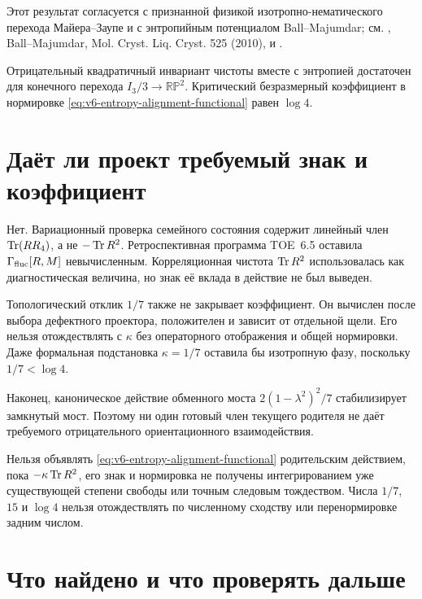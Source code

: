 Этот результат согласуется с признанной физикой изотропно-нематического
перехода Майера--Заупе и с энтропийным потенциалом Ball--Majumdar; см.
, Ball--Majumdar, Mol. Cryst. Liq. Cryst. 525
(2010), и .

\begin{proposition}
Отрицательный квадратичный инвариант чистоты вместе с энтропией достаточен
для конечного перехода $I_3/3\to\mathbb{RP}^2$. Критический безразмерный
коэффициент в нормировке \eqref{eq:v6-entropy-alignment-functional} равен
$\log4$.
\end{proposition}

\section{Даёт ли проект требуемый знак и коэффициент}

Нет. Вариационный проверка семейного состояния содержит линейный член $\operatorname{Tr}(RR_4)$,
а не $-\operatorname{Tr} R^2$. Ретроспективная программа TOE~6.5 оставила
$\Gamma_{\rm fluc}[R,M]$ невычисленным. Корреляционная чистота
$\operatorname{Tr} R^2$ использовалась как диагностическая величина, но знак её вклада
в действие не был выведен.

Топологический отклик $1/7$ также не закрывает коэффициент. Он вычислен
после выбора дефектного проектора, положителен и зависит от отдельной
щели. Его нельзя отождествлять с $\kappa$ без операторного отображения и
общей нормировки. Даже формальная подстановка $\kappa=1/7$ оставила бы
изотропную фазу, поскольку $1/7<\log4$.

Наконец, каноническое действие обменного моста
$2(1-\lambda^2)^2/7$ стабилизирует замкнутый мост. Поэтому ни один
готовый член текущего родителя не даёт требуемого отрицательного
ориентационного взаимодействия.

\begin{nogocriterion}
Нельзя объявлять \eqref{eq:v6-entropy-alignment-functional} родительским
действием, пока $-\kappa\operatorname{Tr} R^2$, его знак и нормировка не получены
интегрированием уже существующей степени свободы или точным следовым
тождеством. Числа $1/7$, $15$ и $\log4$ нельзя отождествлять по
численному сходству или перенормировке задним числом.
\end{nogocriterion}

\section{Что найдено и что проверять дальше}

